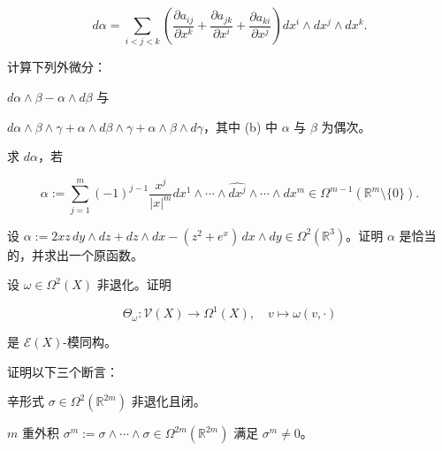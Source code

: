 \begin{exercises}
\[
d\alpha = \sum_{i<j<k} \left( \frac{\partial a_{ij}}{\partial x^k} + \frac{\partial a_{jk}}{\partial x^i} + \frac{\partial a_{ki}}{\partial x^j} \right) dx^i \wedge dx^j \wedge dx^k .
\]
\item

计算下列外微分：

\begin{items}
\item

$ d\alpha \wedge \beta - \alpha \wedge d\beta $ 与

\item

$ d\alpha \wedge \beta \wedge \gamma + \alpha \wedge d\beta \wedge \gamma + \alpha \wedge \beta \wedge d\gamma $，其中 (b) 中 $ \alpha $ 与 $ \beta $ 为偶次。

\end{items}

\item

求 $ d\alpha $，若

\[
\alpha := \sum_{j=1}^{m} (-1)^{j-1} \frac{x^j}{|x|^m} dx^1 \wedge \cdots \wedge \widehat{dx^j} \wedge \cdots \wedge dx^m \in \Omega^{m-1}(\mathbb{R}^m \setminus \{0\}) .
\]
\item

设 $ \alpha := 2xz\,dy \wedge dz + dz \wedge dx - (z^2 + e^x)\,dx \wedge dy \in \Omega^2(\mathbb{R}^3) $。证明 $ \alpha $ 是恰当的，并求出一个原函数。

\item

设 $ \omega \in \Omega^2(X) $ 非退化。证明

\[
\Theta_\omega : \mathcal{V}(X) \to \Omega^1(X), \quad v \mapsto \omega(v, \cdot)
\]

是 $ \mathcal{E}(X) $-模同构。

\item

证明以下三个断言：

\begin{items}
\item

辛形式 $ \sigma \in \Omega^2(\mathbb{R}^{2m}) $ 非退化且闭。

\item

$ m $ 重外积 $ \sigma^m := \sigma \wedge \cdots \wedge \sigma \in \Omega^{2m}(\mathbb{R}^{2m}) $ 满足 $ \sigma^m \neq 0 $。

\item


\end{items}
\end{exercises}

